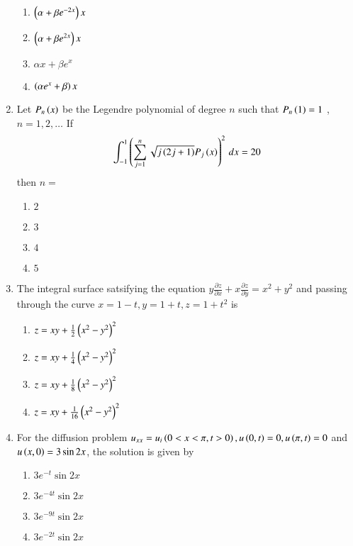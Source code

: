 \documentclass[journal,onecolumn]{IEEEtran}
\theoremstyle{remark}
\begin{document}
\begin{enumerate}
	\begin{enumerate}
		\item $\left(\alpha + \beta e^{-2x}\right)x$
		\item $\left(\alpha + \beta e^{2x}\right)x$
		\item $\alpha x + \beta e^{x}$
		\item $\left(\alpha e^{x} + \beta\right)x$
	\end{enumerate}


    \item Let $P_n\left(x\right)$ be the Legendre polynomial of degree $n$ such that $P_n\left(1\right) = 1$ , $n = 1, 2, \dots$ If
	\begin{align*}
		\int_{-1}^{1} \left(\sum_{j = 1}^{n} \sqrt{j\left(2j + 1\right)} P_j\left(x\right)\right)^2 \, dx = 20
	\end{align*}
	then $n = $
	\hfill{}

	\begin{enumerate}
		\item $2$
		\item $3$
		\item $4$
		\item $5$
	\end{enumerate}


    \item The integral surface satsifying the equation $y\frac{\partial{z}}{\partial{x}} + x\frac{\partial{z}}{\partial{y}} = x^2 + y^2$ and passing through the curve $x = 1 - t, y = 1 + t, z = 1 + t^2$ is
	\hfill{}

	\begin{enumerate}
		\item $z = xy + \frac{1}{2}\left(x^2 - y^2\right)^2$
		\item $z = xy + \frac{1}{4}\left(x^2 - y^2\right)^2$
		\item $z = xy + \frac{1}{8}\left(x^2 - y^2\right)^2$
		\item $z = xy + \frac{1}{16}\left(x^2 - y^2\right)^2$
	\end{enumerate}


    \item For the diffusion problem $u_{xx} = u_{i} \left(0 < x < \pi, t > 0\right), u\left(0, t\right) = 0, u\left(\pi, t\right) = 0$ and $u\left(x, 0\right) = 3\sin{2x}$, the solution is given by
	\hfill{}

	\begin{enumerate}
		\item $3e^{-t}\sin{2x}$
		\item $3e^{-4t}\sin{2x}$
		\item $3e^{-9t}\sin{2x}$
		\item $3e^{-2t}\sin{2x}$
	\end{enumerate}

\end{enumerate}
\end{document}
